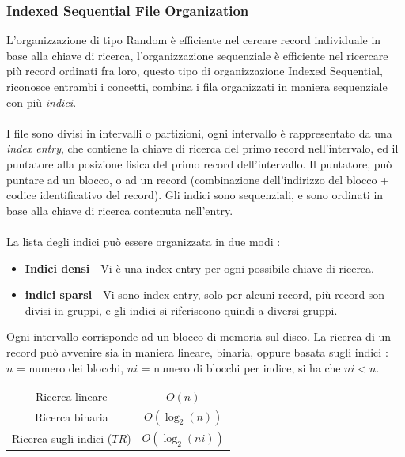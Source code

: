 \documentclass[12pt, letterpaper]{article}
\newcommand{\acc}{\\\hphantom{}\\}
\begin{document}
\subsubsection{Indexed Sequential File Organization}
L'organizzazione di tipo Random è efficiente nel cercare record individuale in base alla chiave di ricerca, l'organizzazione 
sequenziale è efficiente nel ricercare più record ordinati fra loro, questo tipo di organizzazione Indexed Sequential, riconosce
entrambi i concetti, combina i fila organizzati in maniera sequenziale con più \textit{indici}.\acc 
I file sono divisi in intervalli o partizioni, ogni intervallo è rappresentato da una \textit{index entry}, 
che contiene la chiave di ricerca del primo record nell'intervalo, ed il puntatore alla posizione fisica del primo record 
dell'intervallo. Il puntatore, può puntare ad un blocco, o ad un record (combinazione dell'indirizzo del blocco + codice identificativo 
del record). Gli indici sono sequenziali, e sono ordinati in base alla chiave di ricerca contenuta nell'entry.\acc 
La lista degli indici può essere organizzata in due modi : \begin{itemize}
    \item \textbf{Indici densi} - Vi è una index entry per ogni possibile chiave di ricerca. 
    \item \textbf{indici sparsi} - Vi sono index entry, solo per alcuni record, più record son divisi in gruppi, e gli indici 
    si riferiscono quindi a diversi gruppi.
\end{itemize}
Ogni intervallo corrisponde ad un blocco di memoria sul disco. La ricerca di un record può avvenire sia in maniera lineare, binaria, 
oppure basata sugli indici :\\
\(n\) = numero dei blocchi,  \(ni\) = numero di blocchi per indice, si ha che \(ni<n\). 
\begin{center}

    \begin{tabular}{cc}
        \rowcolor[HTML]{C0C0C0} 
        Ricerca lineare                    & \(O(n)\)                  \\
        \rowcolor[HTML]{EFEFEF} 
       Ricerca binaria               & \(O(\log_2(n))\)       \\
        \rowcolor[HTML]{C0C0C0} 
        Ricerca sugli indici (\(TR\)) & \(O(\log_2(ni))\) 
                  
        \end{tabular}
     
\end{center}
\end{document}
